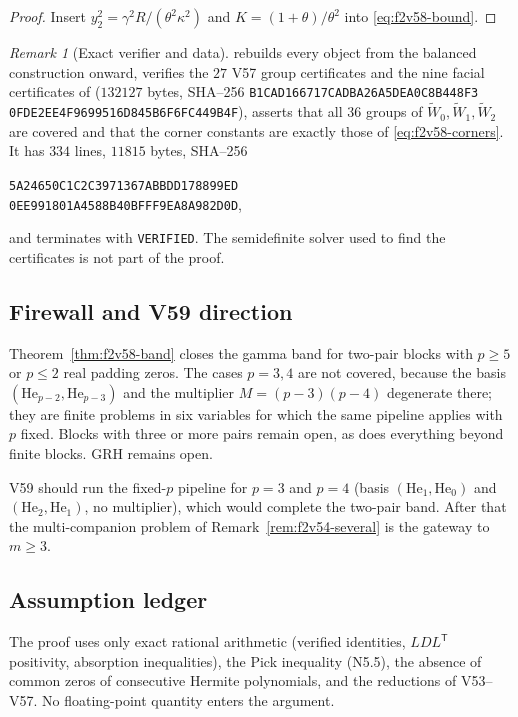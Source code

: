 \documentclass[11pt]{article}
\theoremstyle{definition}
\theoremstyle{remark}
\newtheorem{remark}[theorem]{Remark}
\begin{document}
\begin{proof}
Insert \(y_2^2=\gamma^2R/(\theta^2\kappa^2)\) and
\(K=(1+\theta)/\theta^2\) into \eqref{eq:f2v58-bound}.
\end{proof}

\begin{remark}[Exact verifier and data]
\label{rem:f2v58-verifier}
 rebuilds every object
from the balanced construction onward, verifies the \(27\) V57 group
certificates and the nine facial certificates of
(\(132127\) bytes, SHA--256
\texttt{B1CAD166717CADBA26A5DEA0C8B448F3}\allowbreak
\texttt{0FDE2EE4F9699516D845B6F6FC449B4F}), asserts that all \(36\)
groups of \(\widetilde W_0,\widetilde W_1,\widetilde W_2\) are covered
and that the corner constants are exactly those of
\eqref{eq:f2v58-corners}.  It has \(334\) lines, \(11815\) bytes,
SHA--256
\begin{center}
\texttt{5A24650C1C2C3971367ABBDD178899ED}\\
\texttt{0EE991801A4588B40BFFF9EA8A982D0D},
\end{center}
and terminates with \texttt{VERIFIED}.  The semidefinite solver used to
find the certificates is not part of the proof.
\end{remark}

\subsection*{Firewall and V59 direction}
\label{fire:f2v58}
Theorem~\ref{thm:f2v58-band} closes the gamma band for two-pair blocks
with \(p\ge5\) or \(p\le2\) real padding zeros.  The cases \(p=3,4\)
are not covered, because the basis \((\mathrm{He}_{p-2},\mathrm{He}_{p-3})\)
and the multiplier \(M=(p-3)(p-4)\) degenerate there; they are finite
problems in six variables for which the same pipeline applies with
\(p\) fixed.  Blocks with three or more pairs remain open, as does
everything beyond finite blocks.  GRH remains open.

V59 should run the fixed-\(p\) pipeline for \(p=3\) and \(p=4\)
(basis \((\mathrm{He}_1,\mathrm{He}_0)\) and \((\mathrm{He}_2,\mathrm{He}_1)\),
no multiplier), which would complete the two-pair band.  After that the
multi-companion problem of Remark~\ref{rem:f2v54-several} is the
gateway to \(m\ge3\).

\subsection*{Assumption ledger}
\label{ass:f2v58}
The proof uses only exact rational arithmetic (verified identities,
\(LDL^{\mathsf T}\) positivity, absorption inequalities), the Pick
inequality \textup{(N5.5)}, the absence of common zeros of consecutive
Hermite polynomials, and the reductions of V53--V57.  No floating-point
quantity enters the argument.
\endgroup
\end{document}
